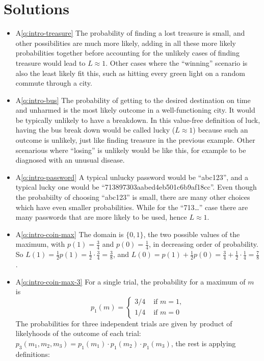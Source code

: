 \section{Solutions}

\begin{itemize}
  \item A\ref{q:intro-treasure} The probability of finding a lost treasure is small, and other possibilities are much more likely, adding in all these more likely probabilities together before accounting for the unlikely cases of finding treasure would lead to $L \approx 1$. Other cases where the ``winning'' scenario is also the least likely fit this, such as hitting every green light on a random commute through a city.
  \item A\ref{q:intro-bus} The probability of getting to the desired destination on time and unharmed is the most likely outcome in a well-functioning city. It would be typically unlikely to have a breakdown.  In this value-free definition of luck, having the bus break down would be called lucky ($L \approx 1$) because such an outcome is unlikely, just like finding treasure in the previous example. Other scenarious where ``losing'' is unlikely would be like this, for example to be diagnosed with an unusual disease.
  \item A\ref{q:intro-password} A typical unlucky password would be ``abc123'', and a typical lucky one would be ``713897303aabed4eb501c6b9af18cc''.  Even though the probabiilty of choosing ``abc123'' is small, there are many other choices which have even smaller probabilities. While for the ``713\ldots'' case there are many passwords that are more likely to be used, hence $L \approx 1$.
\item A\ref{q:intro-coin-max} The domain is $\{0,1\}$, the two possible values of the maximum, with $p(1)=\frac{3}{4}$ and $p(0)=\frac{1}{4}$, in decreasing order of probability.  So $L(1)=\frac{1}{2} p(1) = \frac{1}{2} \cdot \frac{3}{4} = \frac{3}{8}$, and $L(0)=p(1)+\frac{1}{2} p(0) = \frac{3}{4} + \frac{1}{2} \cdot \frac{1}{4} = \frac{7}{8}$.
\item A\ref{q:intro-coin-max-3} For a single trial, the probability for a maximum of $m$ is
\begin{equation}
  p_1(m)=\begin{cases}
           3/4& \text{ if } m = 1,\\
           1/4& \text{ if } m = 0
         \end{cases}
\end{equation}
The probabilities for three independent trials are given by product of likelyhoods of the outcome of each trial: $p_3(m_1,m_2,m_3)=p_1(m_1) \cdot p_1(m_2) \cdot p_1(m_3)$, the rest is applying definitions:
  

\end{itemize}
